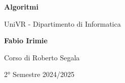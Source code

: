 \begin{titlepage}
	\begin{center}
		\vspace*{1cm}

		\Huge
		\textbf{Algoritmi}

		\vspace{0.5cm}
		\LARGE
		UniVR - Dipartimento di Informatica

		\vspace{1.5cm}

		\textbf{Fabio Irimie}

		\vfill


		\vspace{0.8cm}

    Corso di Roberto Segala

		2° Semestre 2024/2025

	\end{center}
\end{titlepage}
